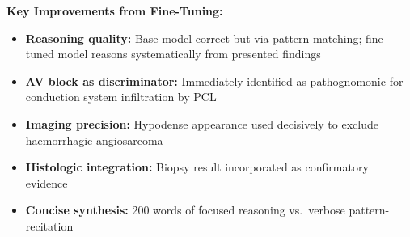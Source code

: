 \documentclass[10pt,journal,compsoc, onecolumn]{IEEEtran}
\begin{document}
\begin{casebox}
    \textbf{Key Improvements from Fine-Tuning:}
    \begin{itemize}[leftmargin=*, noitemsep, topsep=2pt]
        \item \textbf{Reasoning quality:} Base model correct but via pattern-matching; fine-tuned model reasons systematically from presented findings
        \item \textbf{AV block as discriminator:} \colorbox{yellow!30}{Immediately identified as pathognomonic} for conduction system infiltration by PCL
        \item \textbf{Imaging precision:} Hypodense appearance used decisively to exclude haemorrhagic angiosarcoma
        \item \textbf{Histologic integration:} Biopsy result incorporated as confirmatory evidence
        \item \textbf{Concise synthesis:} 200 words of focused reasoning vs.\ verbose pattern-recitation
    \end{itemize}
\end{casebox}

\vspace{1em}
\end{document}
